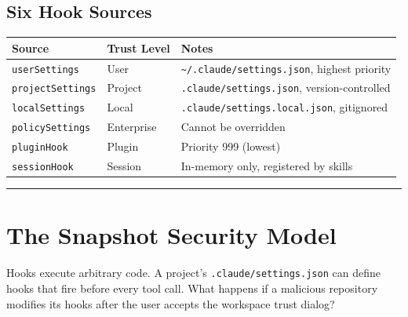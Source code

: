 \documentclass[
  english,
  11pt,
  letterpaper,
]{book}
\begin{document}
\subsection{Six Hook Sources}\label{six-hook-sources}

\begin{longtable}[]{@{}
  >{\raggedright\arraybackslash}p{}
  >{\raggedright\arraybackslash}p{}
  >{\raggedright\arraybackslash}p{}@{}}
\toprule\noalign{}
\begin{minipage}[b]{\linewidth}\raggedright
Source
\end{minipage} & \begin{minipage}[b]{\linewidth}\raggedright
Trust Level
\end{minipage} & \begin{minipage}[b]{\linewidth}\raggedright
Notes
\end{minipage} \\
\midrule\noalign{}
\endhead
\bottomrule\noalign{}
\endlastfoot
\texttt{userSettings} & User &
\texttt{\textasciitilde{}/.claude/settings.json}, highest priority \\
\texttt{projectSettings} & Project & \texttt{.claude/settings.json},
version-controlled \\
\texttt{localSettings} & Local & \texttt{.claude/settings.local.json},
gitignored \\
\texttt{policySettings} & Enterprise & Cannot be overridden \\
\texttt{pluginHook} & Plugin & Priority 999 (lowest) \\
\texttt{sessionHook} & Session & In-memory only, registered by skills \\
\end{longtable}

\begin{center}\rule{0.5\linewidth}{0.5pt}\end{center}

\section{The Snapshot Security Model}\label{the-snapshot-security-model}

Hooks execute arbitrary code. A project's \texttt{.claude/settings.json}
can define hooks that fire before every tool call. What happens if a
malicious repository modifies its hooks after the user accepts the
workspace trust dialog?
\end{document}
